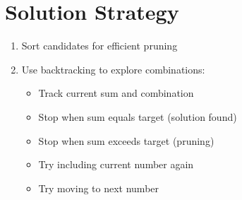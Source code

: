 \section*{Solution Strategy}
\begin{enumerate}
    \item Sort candidates for efficient pruning
    \item Use backtracking to explore combinations:
        \begin{itemize}
            \item Track current sum and combination
            \item Stop when sum equals target (solution found)
            \item Stop when sum exceeds target (pruning)
            \item Try including current number again
            \item Try moving to next number
        \end{itemize}
\end{enumerate}


